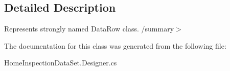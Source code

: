\subsection{Detailed Description}
Represents strongly named Data\+Row class. /summary$>$ 

The documentation for this class was generated from the following file\+:\begin{DoxyCompactItemize}
\item 
Home\+Inspection\+Data\+Set.\+Designer.\+cs\end{DoxyCompactItemize}
